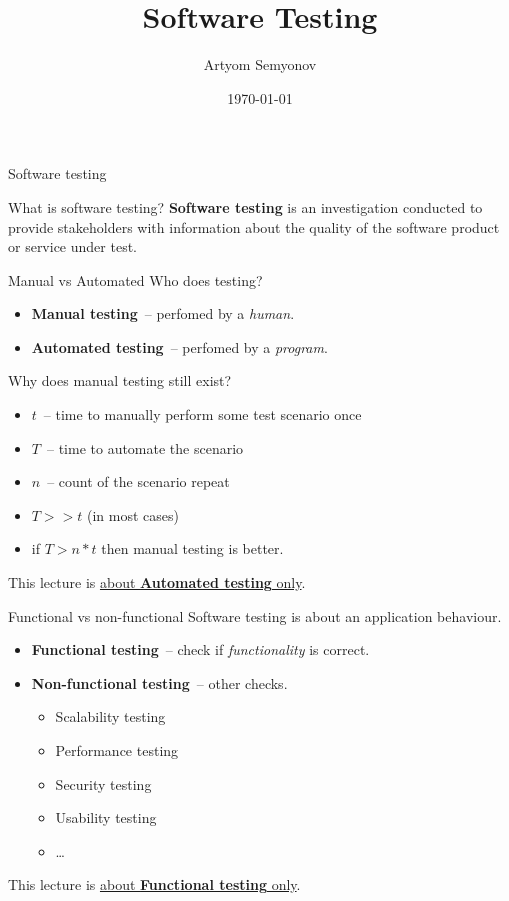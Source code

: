 \documentclass[aspectratio=169]{beamer}
\title{Software Testing}
\author{Artyom Semyonov}
\institute{СПБгУ, СП}
\date{\today}
\begin{document}
\frame{\titlepage}

\begin{frame}{Software testing}
  \begin{block}{What is software testing?}
    \textbf{Software testing} is an investigation conducted to provide stakeholders
    with information about the quality of the software product or service under test.
  \end{block}
\end{frame}

\begin{frame}{Manual vs Automated}
  Who does testing?
  \begin{itemize}
    \item \textbf{Manual testing}~-- perfomed by a \textit{human}.
    \item \textbf{Automated testing}~-- perfomed by a \textit{program}.
  \end{itemize}
  \pause
  Why does manual testing still exist?
  \pause
  \begin{itemize}
    \item $t$~-- time to manually perform some test scenario once
    \item $T$~-- time to automate the scenario
    \item $n$~-- count of the scenario repeat
    \item $T >> t$ (in most cases)
    \item if $T > n * t$ then manual testing is better.
  \end{itemize}
  \bigskip
  \pause
  This lecture is \underline{about \textbf{Automated testing} only}.
\end{frame}

\begin{frame}{Functional vs non-functional}
  Software testing is about an application behaviour.
  \begin{itemize}
    \item \textbf{Functional testing}~-- check if \textit{functionality} is correct.
    \item \textbf{Non-functional testing}~-- other checks.
      \begin{itemize}
        \item Scalability testing
        \item Performance testing
        \item Security testing
        \item Usability testing
        \item \ldots
      \end{itemize}
  \end{itemize}
  \bigskip
  \pause
  This lecture is \underline{about \textbf{Functional testing} only}.
\end{frame}
\end{document}
